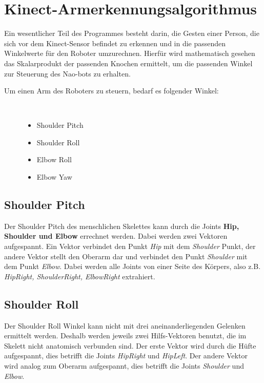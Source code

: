 \section{Kinect-Armerkennungsalgorithmus}\label{algo_angle}
Ein wesentlicher Teil des Programmes besteht darin, die Gesten einer Person, die sich vor dem Kinect-Sensor befindet zu erkennen und in die passenden Winkelwerte für den Roboter umzurechnen.
Hierfür wird mathematisch gesehen das Skalarprodukt der passenden Knochen ermittelt, um die passenden Winkel zur Steuerung des Nao-bots zu erhalten.

\begin{description}
	\item[Um einen Arm des Roboters zu steuern, bedarf es folgender Winkel:]~\par
	\begin{itemize}
		\item Shoulder Pitch
		\item Shoulder Roll
		\item Elbow Roll
		\item Elbow Yaw
	\end{itemize}
\end{description}

\subsection{Shoulder Pitch}
Der Shoulder Pitch des menschlichen Skelettes kann durch die Joints \textbf{Hip, Shoulder und Elbow} errechnet werden. Dabei werden zwei Vektoren aufgespannt. Ein Vektor verbindet den Punkt \textit{Hip} mit dem \textit{Shoulder} Punkt, der andere Vektor stellt den Oberarm dar und verbindet den Punkt \textit{Shoulder} mit dem Punkt \textit{Elbow}. Dabei werden alle Joints von einer Seite des Körpers, also z.B. \textit{HipRight, ShoulderRight, ElbowRight} extrahiert.


\subsection{Shoulder Roll}
Der Shoulder Roll Winkel kann nicht mit drei aneinanderliegenden Gelenken ermittelt werden. Deshalb werden  jeweils zwei Hilfs-Vektoren benutzt, die im Skelett nicht anatomisch verbunden sind. Der erste Vektor wird durch die Hüfte aufgespannt, dies betrifft die Joints \textit{HipRight} und \textit{HipLeft}. Der andere Vektor wird analog zum Oberarm aufgespannt, dies betrifft die Joints \textit{Shoulder} und \textit{Elbow}.

